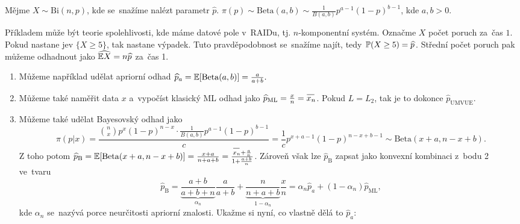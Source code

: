 \begin{example}
	Mějme $X\sim \mathrm{Bi}(n,p)$, kde se~snažíme nalézt parametr $\widehat{p}$. $\pi(p)\sim\mathrm{Beta}(a,b)\sim\frac{1}{B(a,b)}p^{a-1}(1-p)^{b-1}$, kde $a,b>0$. 
	
	Příkladem může být teorie spolehlivosti, kde máme datové pole v~RAIDu, tj. $n$-komponentní systém. Označme $X$ počet poruch za~čas $1$. Pokud nastane jev $\{X\geq5\}$, tak nastane výpadek. Tuto pravděpodobnost se~snažíme najít, tedy $\mathbb{P}(X\geq5)=\widehat{p}$. Střední počet poruch pak můžeme odhadnout jako $\widehat{\mathbb{E} X}=n\widehat{p}$ za~čas 1.
	
	\begin{enumerate}[1)]
		\item Můžeme například udělat apriorní odhad $\widehat{p}_a=\mathbb{E}[\mathrm{Beta}(a,b)]=\frac{a}{a+b}.$
		\item Můžeme také naměřit data $x$ a~vypočíst klasický ML odhad jako $\widehat{p}_\mathrm{ML}=\frac{x}{n}=\oxnn$. Pokud $L=L_2$, tak je to dokonce $\widehat{p}_\mathrm{UMVUE}$.
		\item Můžeme také udělat Bayesovský odhad jako $$\pi(p|x)=\frac{\binom{n}{x}p^x(1-p)^{n-x}\cdot\frac{1}{B(a,b)}p^{a-1}(1-p)^{b-1}}{c}=\frac{1}{c}p^{x+a-1}(1-p)^{n-x+b-1}\sim\mathrm{Beta}(x+a,n-x+b).$$
		Z toho potom $\widehat{p}_\mathrm{B}=\E [\mathrm{Beta}(x+a,n-x+b)]=\frac{x+a}{n+a+b}=\frac{\oxnn+\frac{a}{n}}{1+\frac{a+b}{n}}$. Zároveň však lze $\widehat{p}_\mathrm{B}$ zapsat jako konvexní kombinaci z~bodu 2 ve~tvaru
		$$ \widehat{p}_\mathrm{B}=\underbrace{\frac{a+b}{a+b+n}}_{\alpha_n}\frac{a}{a+b}+\underbrace{\frac{n}{n+a+b}}_{1-\alpha_n}\frac{x}{n}=\alpha_n\widehat{p}_a+(1-\alpha_n)\widehat{p}_\mathrm{ML},$$ kde $\alpha_n$ se~nazývá porce neurčitosti apriorní znalosti. Ukažme si nyní, co vlastně dělá to $\widehat{p}_a$:
		\begin{figure}[h]
			\centering
\end{figure}
\end{enumerate}
\end{example}
